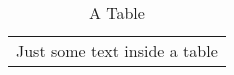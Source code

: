 \begin{table}
	\begin{center}
		\begin{tabular}{|p{30cm}|}
			Just some text inside a table
		\end{tabular}
	\end{center}
	\caption{A Table}
	\label{tab:ATable}
\end{table}
